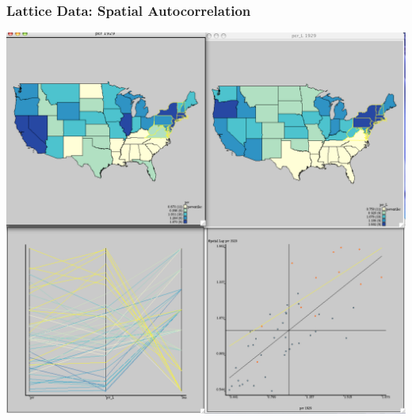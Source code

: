 \documentclass[nototal]{beamer}
\begin{document}
\begin{frame}
    \frametitle{Lattice Data: Spatial Autocorrelation}
    \begin{center}
      \includegraphics[width=.65\linewidth]{lattice2}
    \end{center}
  \end{frame}
\end{document}
